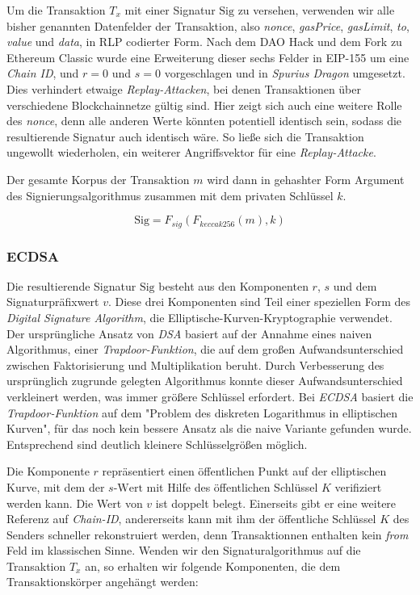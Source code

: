\documentclass[runningheads]{llncs}
\begin{document}
Um die Transaktion $ T_x $ mit einer Signatur $ \text{Sig} $ zu versehen, verwenden wir alle bisher genannten Datenfelder der Transaktion, also \textit{nonce}, \textit{gasPrice}, \textit{gasLimit}, \textit{to}, \textit{value} und \textit{data}, in RLP codierter Form. Nach dem DAO Hack und dem Fork zu Ethereum Classic wurde eine Erweiterung dieser sechs Felder in EIP-155 \cite{noauthor_ethereum/eips_nodate} um eine \textit{Chain ID}, und $ r = 0 $ und $ s = 0 $ vorgeschlagen und in \textit{Spurius Dragon} umgesetzt. Dies verhindert etwaige \textit{Replay-Attacken}, bei denen Transaktionen über verschiedene Blockchainnetze gültig sind. \cite[S. 138]{iyer_cryptoeconomics_2018} Hier zeigt sich auch eine weitere Rolle des \textit{nonce}, denn alle anderen Werte könnten potentiell identisch sein, sodass die resultierende Signatur auch identisch wäre. So ließe sich die Transaktion ungewollt wiederholen, ein weiterer Angriffsvektor für eine \textit{Replay-Attacke}.

Der gesamte Korpus der Transaktion $ m $ wird dann in gehashter Form Argument des Signierungsalgorithmus zusammen mit dem privaten Schlüssel $ k $.

$$
  \text{Sig} = F_{sig}(F_{keccak256}(m), k)
$$

\subsubsection{ECDSA}
\label{ecdsa}
Die resultierende Signatur $ \text{Sig} $ besteht aus den Komponenten $ r $, $ s $ und dem Signaturpräfixwert $ v $.  Diese drei Komponenten sind Teil einer speziellen Form des \textit{Digital Signature Algorithm}, die Elliptische-Kurven-Kryptographie verwendet. Der ursprüngliche Ansatz von \textit{DSA} basiert auf der Annahme eines naiven Algorithmus, einer \textit{Trapdoor-Funktion}, die auf dem großen Aufwandsunterschied zwischen Faktorisierung und Multiplikation beruht. Durch Verbesserung des ursprünglich zugrunde gelegten Algorithmus konnte dieser Aufwandsunterschied verkleinert werden, was immer größere Schlüssel erfordert. Bei \textit{ECDSA} basiert die \textit{Trapdoor-Funktion} auf dem "Problem des diskreten Logarithmus in elliptischen Kurven", für das noch kein bessere Ansatz als die naive Variante gefunden wurde. Entsprechend sind deutlich kleinere Schlüsselgrößen möglich. \cite{noauthor_elliptic_2020}

Die Komponente $ r $ repräsentiert einen öffentlichen Punkt auf der elliptischen Kurve, mit dem der $ s\text{-Wert} $ mit Hilfe des öffentlichen Schlüssel $ K $ verifiziert werden kann. Die Wert von $ v $ ist doppelt belegt. Einerseits gibt er eine weitere Referenz auf \textit{Chain-ID}, andererseits kann mit ihm der öffentliche Schlüssel $ K $ des Senders schneller rekonstruiert werden, denn Transaktionnen enthalten kein \textit{from} Feld im klassischen Sinne. Wenden wir den Signaturalgorithmus auf die Transaktion $ T_x $ an, so erhalten wir folgende Komponenten, die dem Transaktionskörper angehängt werden: \cite[S. 114 ff.]{antonopoulos_mastering_2019}
\end{document}
